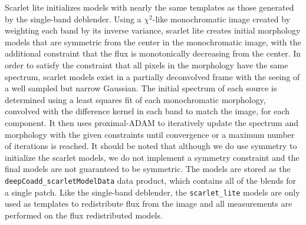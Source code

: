 Scarlet lite initializes models with nearly the same templates as those generated by the single-band deblender.
Using a $\chi^2$-like monochromatic image created by weighting each band by its inverse variance, scarlet lite creates initial morphology models that are symmetric from the center in the monochromatic image, with the additional constraint that the flux is monotonically decreasing from the center.
In order to satisfy the constraint that all pixels in the morphology have the same spectrum, scarlet models exist in a partially deconvolved frame with the seeing of a well sampled but narrow Gaussian.
The initial spectrum of each source is determined using a least squares fit of each monochromatic morphology, convolved with the difference kernel in each band to match the image, for each component.
It then uses proximal-ADAM \citep[PADAM,][]{2019arXiv191010094M} to iteratively update the spectrum and morphology with the given constraints until convergence or a maximum number of iterations is reached.
It should be noted that although we do use symmetry to initialize the scarlet models, we do not implement a symmetry constraint and the final models are not guaranteed to be symmetric.
The models are stored as the \texttt{deepCoadd\_scarletModelData} data product, which contains all of the blends for a single patch.
Like the single-band deblender, the \texttt{scarlet\_lite} models are only used as templates to redistribute flux from the image and all measurements are performed on the flux redistributed models.
